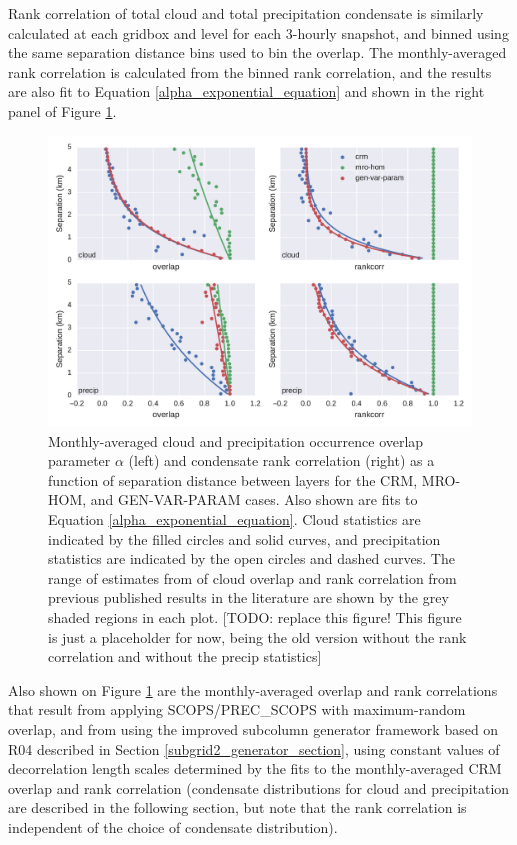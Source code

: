 Rank correlation of total cloud and total precipitation condensate is similarly calculated at each gridbox and level for each 3-hourly snapshot, and binned using the same separation distance bins used to bin the overlap. The monthly-averaged rank correlation is calculated from the binned rank correlation, and the results are also fit to Equation \ref{alpha_exponential_equation} and shown in the right panel of Figure \ref{overlap_rankcorr}. 

\begin{figure}
\includegraphics[width=\columnwidth]{graphics/subgrid2_overlap.pdf}
\caption{Monthly-averaged cloud and precipitation occurrence overlap parameter $\alpha$ (left) and condensate rank correlation (right) as a function of separation distance between layers for the CRM, MRO-HOM, and GEN-VAR-PARAM cases. Also shown are fits to Equation \ref{alpha_exponential_equation}. Cloud statistics are indicated by the filled circles and solid curves, and precipitation statistics are indicated by the open circles and dashed curves. The range of estimates from of cloud overlap and rank correlation from previous published results in the literature are shown by the grey shaded regions in each plot. [TODO: replace this figure! This figure is just a placeholder for now, being the old version without the rank correlation and without the precip statistics]}
\label{overlap_rankcorr}
\end{figure}

Also shown on Figure \ref{overlap_rankcorr} are the monthly-averaged overlap and rank correlations that result from applying SCOPS/PREC\_SCOPS with maximum-random overlap, and from using the improved subcolumn generator framework based on R04 described in Section \ref{subgrid2_generator_section}, using constant values of decorrelation length scales determined by the fits to the monthly-averaged CRM overlap and rank correlation (condensate distributions for cloud and precipitation are described in the following section, but note that the rank correlation is independent of the choice of condensate distribution).

